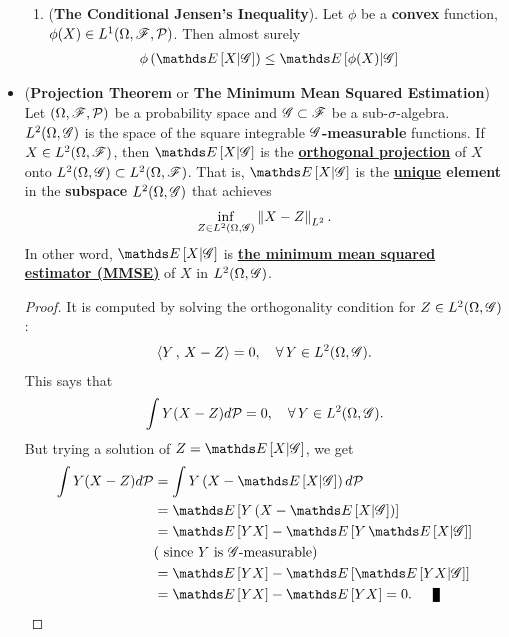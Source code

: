 \documentclass[11pt]{article}
\begin{document}
\begin{itemize}
\begin{proposition}
\begin{enumerate}
\item (\textbf{The Conditional Jensen's Inequality}). Let $\phi$ be a \textbf{convex} function, $\phi(X) \in L^1(\Omega, {\mathscr F}, {\mathcal P})$. Then almost surely
\begin{align*}
\phi\paren{\E{}{X | \srG}} &\le \E{}{\phi(X) | \srG}
\end{align*}
\end{enumerate}
\end{proposition}

\item \begin{theorem} (\textbf{Projection Theorem} or \textbf{The Minimum Mean Squared Estimation}) \citep{billingsley2008probability, resnick2013probability} \\
Let $(\Omega, {\mathscr F}, {\mathcal P})$ be a probability space and ${\mathscr G} \subset {\mathscr F}$ be a sub-$\sigma$-algebra.  $L^{2}(\Omega, {\mathscr G})$ is the space of the square integrable \textbf{${\mathscr G}$-measurable} functions. If $X \in L^{2}(\Omega, {\mathscr F})$, then $\E{}{X| \srG}$ is the \underline{\textbf{orthogonal projection}} of $X$ onto $L^{2}(\Omega, {\mathscr G}) \subset  L^{2}(\Omega, {\mathscr F})$. That is, $\E{}{X| \srG}$ is the \textbf{\underline{unique} element} in the \textbf{subspace} $L^{2}(\Omega, {\mathscr G})$ that achieves
\begin{align*}
\inf_{Z \in L^{2}(\Omega, {\mathscr G})}\left\|X - Z\right\|_{L^2}.
\end{align*} In other word, $\E{}{X| \srG}$ is \underline{\textbf{the minimum mean squared estimator (MMSE)}} of $X$ in $L^{2}(\Omega, {\mathscr G})$.
\end{theorem}
\begin{proof}
It is computed by solving the orthogonality condition for $Z \in L^{2}(\Omega, {\mathscr G})$:
\begin{align*}
\left\langle Y\,,\, X - Z \right\rangle = 0, \quad \forall\, Y \in L^{2}(\Omega, {\mathscr G}).
\end{align*}
This says that
\begin{align*}
\int Y(X-Z) d{\mathcal P} = 0, \quad \forall\, Y \in L^{2}(\Omega, {\mathscr G}).
\end{align*}
But trying a solution of $Z = \E{}{X| \srG}$, we get
\begin{align*}
\int Y(X-Z) d\cP  &= \int Y\paren{X-  \E{}{X| \srG}} d\cP \\
&= \E{}{Y\paren{X-  \E{}{X| \srG}}}\\
&= \E{}{YX} - \E{}{Y\,\E{}{X| \srG}} \\
& (\text{ since }Y \text{ is $\srG$-measurable})\\
&= \E{}{YX} - \E{}{\E{}{YX| \srG}}\\
&= \E{}{YX} - \E{}{YX} = 0. \qed
\end{align*}
\end{proof}


\end{itemize}
\end{document}
